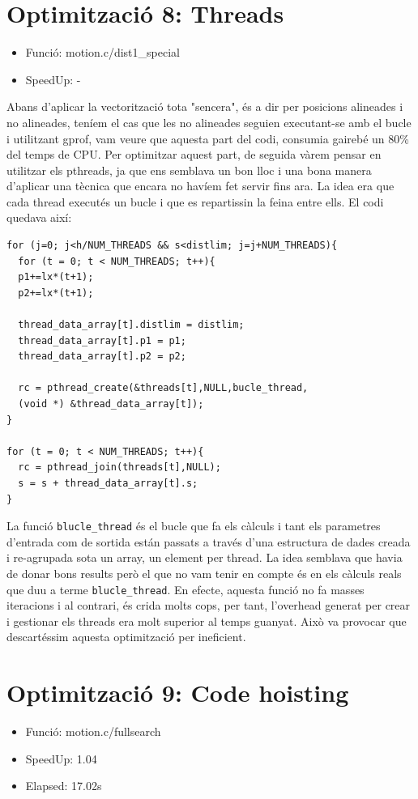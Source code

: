 \section{Optimitzaci\'o 8: Threads}
\begin{itemize}
\item{Funció: motion.c/dist1\_special}
\item{SpeedUp: -}
\end{itemize}

Abans d'aplicar la vectorització tota "sencera", és a dir per posicions alineades i no alineades, teníem el cas que les no alineades seguien executant-se amb el bucle i utilitzant gprof, vam veure que aquesta part del codi, consumia gairebé un 80\% del temps de CPU. Per optimitzar aquest part, de seguida vàrem pensar en utilitzar els pthreads, ja que ens semblava un bon lloc i una bona manera d'aplicar una tècnica que encara no havíem fet servir fins ara. La idea era que cada thread executés un bucle i que es repartissin la feina entre ells. El codi quedava així:

\begin{lstlisting}
for (j=0; j<h/NUM_THREADS && s<distlim; j=j+NUM_THREADS){   
  for (t = 0; t < NUM_THREADS; t++){
  p1+=lx*(t+1);
  p2+=lx*(t+1);

  thread_data_array[t].distlim = distlim;
  thread_data_array[t].p1 = p1;
  thread_data_array[t].p2 = p2;

  rc = pthread_create(&threads[t],NULL,bucle_thread,
  (void *) &thread_data_array[t]);
}

for (t = 0; t < NUM_THREADS; t++){
  rc = pthread_join(threads[t],NULL);
  s = s + thread_data_array[t].s;
}		 	
\end{lstlisting}

La funció \texttt{blucle\_thread} és el bucle que fa els càlculs i tant els parametres d'entrada com de sortida están passats a través d'una estructura de dades creada i re-agrupada sota un array, un element per thread. La idea semblava que havia de donar bons results però el que no vam tenir en compte és en els càlculs reals que duu a terme \texttt{blucle\_thread}. En efecte, aquesta funció no fa masses iteracions i al contrari, és crida molts cops, per tant, l'overhead generat per crear i gestionar els threads era molt superior al temps guanyat. Això va provocar que descartéssim aquesta optimització per ineficient.

\section{Optimitzaci\'o 9: Code hoisting}
\begin{itemize}
\item{Funció: motion.c/fullsearch}
\item{SpeedUp: 1.04}
\item{Elapsed: 17.02s}
\end{itemize}

